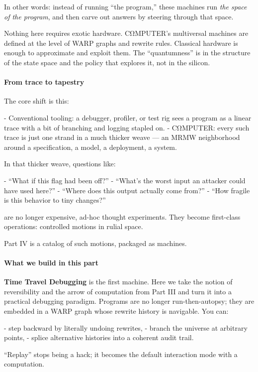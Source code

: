 In other words: instead of running “the program,” these machines run \emph{the space of the program}, and then carve out answers by steering through that space.

Nothing here requires exotic hardware. CΩMPUTER’s multiversal machines are defined at the level of WARP graphs and rewrite rules. Classical hardware is enough to approximate and exploit them. The “quantumness” is in the structure of the state space and the policy that explores it, not in the silicon.

\paragraph{From trace to tapestry}

The core shift is this:

- Conventional tooling: a debugger, profiler, or test rig sees a program as a linear trace with a bit of branching and logging stapled on.
- CΩMPUTER: every such trace is just one strand in a much thicker weave — an MRMW neighborhood around a specification, a model, a deployment, a system.

In that thicker weave, questions like:

- “What if this flag had been off?”
- “What’s the worst input an attacker could have used here?”
- “Where does this output actually come from?”
- “How fragile is this behavior to tiny changes?”

are no longer expensive, ad-hoc thought experiments. They become first-class operations: controlled motions in rulial space.

Part IV is a catalog of such motions, packaged as machines.

\paragraph{What we build in this part}

\textbf{Time Travel Debugging} is the first machine. Here we take the notion of reversibility and the arrow of computation from Part III and turn it into a practical debugging paradigm. Programs are no longer run-then-autopsy; they are embedded in a WARP graph whose rewrite history is navigable. You can:

- step backward by literally undoing rewrites,
- branch the universe at arbitrary points,
- splice alternative histories into a coherent audit trail.

“Replay” stops being a hack; it becomes the default interaction mode with a computation.

